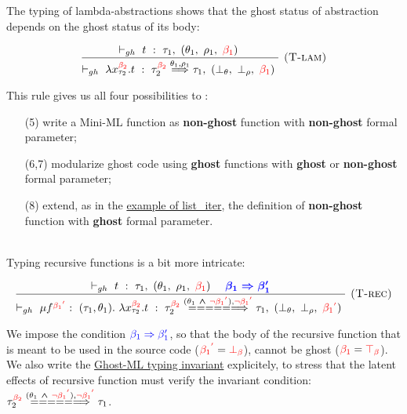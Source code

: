 \documentclass[a4paper,11pt,oneside]{article}
\theoremstyle{plain}
\newcommand{\rouge}[1]{\textcolor{red}{#1}}
\newcommand{\bwedge}{\boldsymbol{~\wedge~}}
\newcommand{\ghosttyping}[6]{\vdash_{gh}~#1~:~#2,~(#3,~#4,~\rouge{#5})~\textcolor{blue}{\boldsymbol{#6}}}
\newcommand{\bth}{\bot_\theta}
\newcommand{\brh}{\bot_\rho}
\newcommand{\gba}[1]{\beta_{#1}}
\newcommand{\gbb}{\bot_\beta}
\newcommand{\gbt}{\top_\beta}
\newcommand{\gbra}[1]{\textcolor{red}{\gba{#1}}}
\newcommand{\gbbr}{\textcolor{red}{\gbb}}
\newcommand{\gbtr}{\textcolor{red}{\gbt}}
\newcommand{\gbran}[1]{\textcolor{red}{\neg\gba{#1}}}
\begin{document}
The typing of lambda-abstractions shows that the ghost status of abstraction depends on the ghost status of its body:
\begin{footnotesize}	
\begin{displaymath}
\begin{array}{l}
\dfrac
	{\ghosttyping
		{t}
		{\tau_1}
		{\theta_1}
		{\rho_1}
		{\gbra{1}}
		{}}
	{\ghosttyping
		{\lambda x^{\gbra{2}}_{\tau_2} . t}
		{\tau_{2}^{\gbra{2}} \stackrel{\theta_1, \rho_1}{\Longrightarrow} \tau_1}
		{\bth}
		{\brh}
		{\gbra{1}}
		{}}
	{\textsc{  (T-lam)}}
\end{array}	
\end{displaymath}
\end{footnotesize}	
This rule gives us all four possibilities to :
\begin{itemize}
\item[(5)] write a Mini-ML function as \textbf{non-ghost} function with \textbf{non-ghost} formal parameter; 

\item[(6,7)] modularize ghost code using \textbf{ghost} functions with \textbf{ghost} or \textbf{non-ghost} formal parameter; 

\item[(8)] extend, as in the \hyperlink{list-iter}{example of list\_iter}, the definition of \textbf{non-ghost} function with \textbf{ghost} formal parameter.
\end{itemize}
~\\
Typing recursive functions is a bit more intricate:
\begin{footnotesize}	
\begin{displaymath}
\begin{array}{l}
\dfrac
	{\ghosttyping
		{t}
		{\tau_1}
		{\theta_1}
		{\rho_1}
		{\gbra{1}}
		{\quad \gba{1} \Rightarrow \beta_1'}}
	{\ghosttyping
		{\mu f^{\gbra{1}^{\rouge{'}}}:~(\tau_1, \theta_1).~\lambda x^{\gbra{2}}_{\tau_2}. t} 
		{\tau_{2}^{\gbra{2}} \stackrel{(\theta_1 \bwedge \gbran{1}^{\rouge{'}}), \gbran{1}^{\rouge{'}}}{=======>} \tau_1}
		{\bth}
		{\brh}
		{\gbra{1}^{\rouge{'}}}
		{}}
	{\textsc{  (T-rec)}}
\end{array}	
\end{displaymath}
\end{footnotesize}
We impose the condition $\textcolor{blue}{\gba{1} \Rightarrow \beta_1'}$, so that the body of the recursive function that is meant to be used in the source code ($\gbra{1}^{\rouge{'}} = \gbbr$), cannot be ghost ($\gbra{1} = \gbtr$).   
We also write the \hyperlink{gh-typ-inv}{Ghost-ML typing invariant} explicitely, to stress that the latent effects of recursive function must verify the invariant condition:
${\tau_{2}^{\gbra{2}} \stackrel{(\theta_1 \bwedge \gbran{1}^{\rouge{'}}), \gbran{1}^{\rouge{'}}}{=======>} \tau_1}$.
\end{document}

